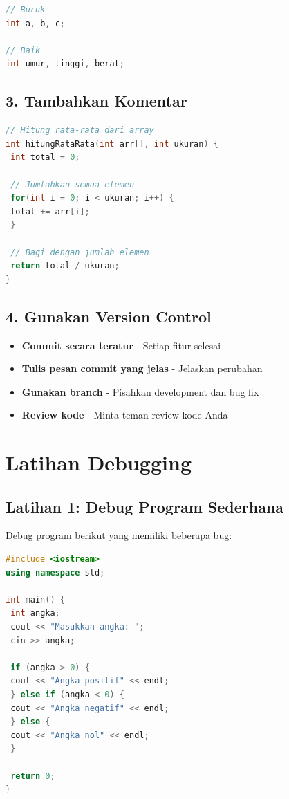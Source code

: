 \begin{lstlisting}[language=c++, caption=Nama Variabel yang Bermakna]
// Buruk
int a, b, c;

// Baik
int umur, tinggi, berat;
\end{lstlisting}

\subsection{3. Tambahkan Komentar}

\begin{lstlisting}[language=c++, caption=Komentar yang Berguna]
// Hitung rata-rata dari array
int hitungRataRata(int arr[], int ukuran) {
 int total = 0;

 // Jumlahkan semua elemen
 for(int i = 0; i < ukuran; i++) {
 total += arr[i];
 }

 // Bagi dengan jumlah elemen
 return total / ukuran;
}
\end{lstlisting}

\subsection{4. Gunakan Version Control}

\begin{itemize}
\item \textbf{Commit secara teratur} - Setiap fitur selesai
\item \textbf{Tulis pesan commit yang jelas} - Jelaskan perubahan
\item \textbf{Gunakan branch} - Pisahkan development dan bug fix
\item \textbf{Review kode} - Minta teman review kode Anda
\end{itemize}

\section{Latihan Debugging}

\subsection{Latihan 1: Debug Program Sederhana}

Debug program berikut yang memiliki beberapa bug:

\begin{lstlisting}[language=c++, caption=Program dengan Bug]
#include <iostream>
using namespace std;

int main() {
 int angka;
 cout << "Masukkan angka: ";
 cin >> angka;

 if (angka > 0) {
 cout << "Angka positif" << endl;
 } else if (angka < 0) {
 cout << "Angka negatif" << endl;
 } else {
 cout << "Angka nol" << endl;
 }

 return 0;
}
\end{lstlisting}

